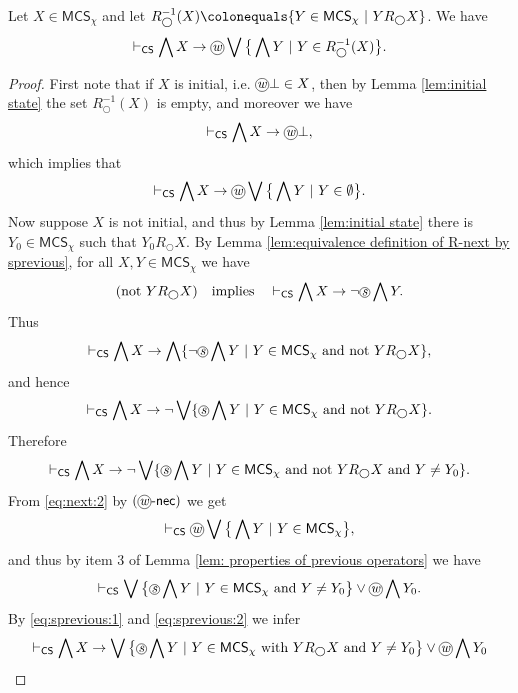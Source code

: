 \documentclass[envcountsect,envcountsame,oribibl,orivec]{llncs}
\newcommand*\circled[1]{\tikz[baseline=(char.base)]{
		\node[shape=circle,draw,inner sep=0.4pt] (char) {#1};}}
\newcommand{\lnext}{\bigcirc}
\newcommand{\wprevious}{\circled{\textit{w}}}
\newcommand{\sprevious}{\circled{\textit{s}}}
\newcommand{\necrule}{\ensuremath{\textsf{-nec}}}
\newcommand{\prevnecrule}{\ensuremath{(\wprevious\necrule)}}
\newcommand{\CS}{\textsf{CS}}
\newcommand{\MCS}{\mathsf{MCS}}
\begin{document}
\begin{lemma}\label{lem:wprevious-relation}
	Let $X \in \MCS_\chi$ and let 
	$R_\lnext^{-1}(X) \colonequals \{ Y \in  \MCS_\chi \ |\ Y  R_\lnext X \}$.
	We have 
	\[
	\vdash_\CS \bigwedge X \to \wprevious \bigvee \big\{ \bigwedge Y \ |\ Y \in R_\lnext^{-1}(X) \big\}.
	\]
\end{lemma}
\begin{proof} 
	First note that if $X$ is initial, i.e. $\wprevious \bot \in X$, then by Lemma \ref{lem:initial state} the set $R_\lnext^{-1}(X)$ is empty, and moreover we have 
	\[
	\vdash_\CS \bigwedge X \to \wprevious \bot,
	\]
	which implies that 
	\[
	\vdash_\CS \bigwedge X \to \wprevious \bigvee \big\{ \bigwedge Y \ |\ Y \in \emptyset \big\}.
	\]
	Now suppose	$X$ is not initial, and thus  by Lemma \ref{lem:initial state} there is $Y_0 \in \MCS_\chi$ such that $Y_0 R_\lnext X$. By Lemma \ref{lem:equivalence definition of R-next by sprevious}, for all $X, Y \in \MCS_\chi$ we have 
	\begin{equation*}
		(\text{not } Y R_\lnext X) 
		\quad\text{implies}\quad
		\vdash_\CS \bigwedge X \to \lnot \sprevious \bigwedge Y.
	\end{equation*}
	Thus 
	\[
	\vdash_\CS \bigwedge X \to \bigwedge\{ \lnot \sprevious \bigwedge Y~|~Y \in \MCS_\chi \text{~and not }  Y R_\lnext X\},
	\]
	and hence
	\begin{equation*}
		\vdash_\CS \bigwedge X \to \neg \bigvee \{ \sprevious \bigwedge Y~|~ Y \in \MCS_\chi \text{~and not } Y R_\lnext X\}.
	\end{equation*}
	Therefore
	\begin{equation}\label{eq:sprevious:1}
		\vdash_\CS \bigwedge X \to \neg \bigvee \{ \sprevious \bigwedge Y~|~ Y \in \MCS_\chi \text{~and not } Y R_\lnext X \text{ and } Y \neq Y_0 \}.
	\end{equation}
	From \eqref{eq:next:2}  by $\prevnecrule$  we get
	\[
	\vdash_\CS \wprevious \bigvee \big\{ \bigwedge Y \ |\ Y \in  \MCS_\chi \big\},
	\]
	and thus by item 3 of Lemma \ref{lem: properties of previous operators} we have
	\begin{equation}\label{eq:sprevious:2}
		\vdash_\CS \bigvee \big\{ \sprevious \bigwedge Y \ |\ Y \in  \MCS_\chi  \text{ and }  Y \neq Y_0 \big\} \vee \wprevious \bigwedge Y_0.
	\end{equation}
	By \eqref{eq:sprevious:1} and \eqref{eq:sprevious:2} we infer
	\[
	\vdash_\CS \bigwedge X \to \bigvee \big\{ \sprevious \bigwedge Y \ |\ Y \in  \MCS_\chi  \text{ with } Y  R_\lnext X  \text{ and } Y \neq Y_0 \big\} \vee \wprevious \bigwedge Y_0
\]
\end{proof}
\end{document}
